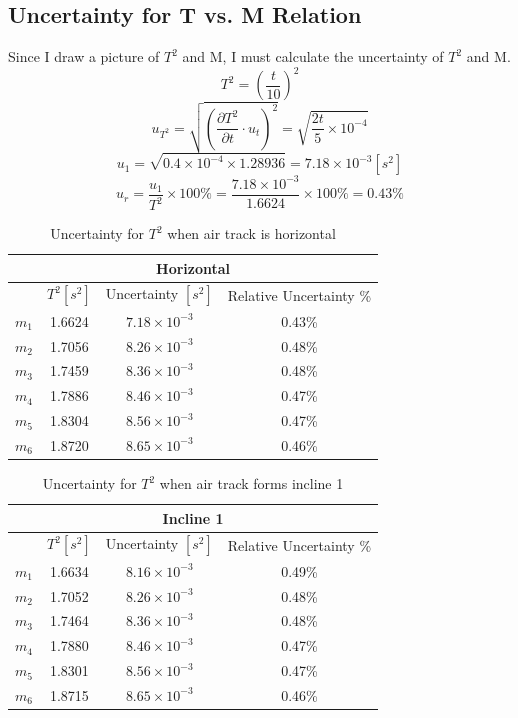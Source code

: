 \documentclass[12pt]{article}
\begin{document}
\subsection{Uncertainty for T vs. M Relation}
Since I draw a picture of $T^2$ and M, I must calculate the uncertainty of $T^2$ and M.
$$T^2=(\frac{t}{10})^2$$
$$u_{T^2}=\sqrt{(\frac{\partial{T^2}}{\partial{t}}\cdot{u_t})^2}=\sqrt{\frac{2t}{5}\times10^{-4}}$$
$$u_1=\sqrt{0.4\times10^{-4}\times1.28936}=7.18\times10^{-3}[s^2]$$
$$u_r=\frac{u_1}{T^2}\times100\%=\frac{7.18\times10^{-3}}{1.6624}\times100\%=0.43\%$$
\begin{table}[H]
\centering
\begin{tabular}{|c|c|c|c|}
\hline
\multicolumn{4}{|c|}{Horizontal}                \\ \hline
  & $T^2[s^2]$      & Uncertainty $[s^2]$ & Relative Uncertainty \% \\ \hline
$m_1$ & 1.6624 		  & $7.18\times10^{-3}$        & 0.43\%                \\ \hline
$m_2$  & 1.7056       & $8.26\times10^{-3}$            &   0.48\%                \\ \hline
$m_3$  & 1.7459       & $8.36\times10^{-3}$            &  0.48\%                    \\ \hline
$m_4$  & 1.7886       & $8.46\times10^{-3}$            &  0.47\%                    \\ \hline
$m_5$  & 1.8304       & $8.56\times10^{-3}$            &  0.47\%                    \\ \hline
$m_6$  & 1.8720       & $8.65\times10^{-3}$            &  0.46\%                      \\ \hline
\end{tabular}
\caption{Uncertainty for $T^2$ when air track is horizontal}
\end{table}
\begin{table}[H]
\centering
\begin{tabular}{|c|c|c|c|}
\hline
\multicolumn{4}{|c|}{Incline 1}                \\ \hline
  & $T^2[s^2]$      & Uncertainty $[s^2]$ & Relative Uncertainty \% \\ \hline
$m_1$ & 1.6634 		  & $8.16\times10^{-3}$        & 0.49\%                \\ \hline
$m_2$  & 1.7052       & $8.26\times10^{-3}$            &   0.48\%                \\ \hline
$m_3$  & 1.7464       & $8.36\times10^{-3}$            &  0.48\%                    \\ \hline
$m_4$  & 1.7880       & $8.46\times10^{-3}$            &  0.47\%                    \\ \hline
$m_5$  & 1.8301       & $8.56\times10^{-3}$            &  0.47\%                    \\ \hline
$m_6$  & 1.8715       & $8.65\times10^{-3}$            &  0.46\%                      \\ \hline
\end{tabular}
\caption{Uncertainty for $T^2$ when air track forms incline 1}
\end{table}
\end{document}
